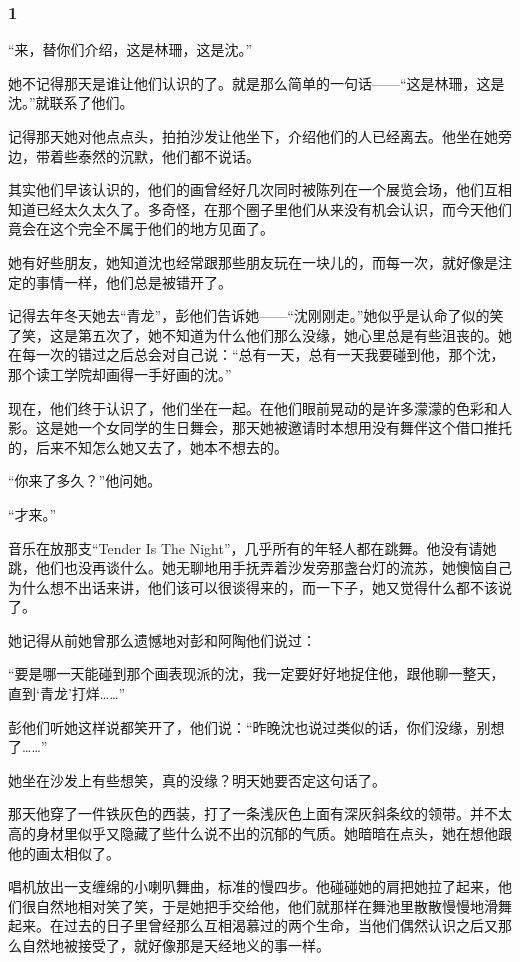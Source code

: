 \subsubsection*{1}
\par “来，替你们介绍，这是林珊，这是沈。”
\par 她不记得那天是谁让他们认识的了。就是那么简单的一句话——“这是林珊，这是沈。”就联系了他们。
\par 记得那天她对他点点头，拍拍沙发让他坐下，介绍他们的人已经离去。他坐在她旁边，带着些泰然的沉默，他们都不说话。
\par 其实他们早该认识的，他们的画曾经好几次同时被陈列在一个展览会场，他们互相知道已经太久太久了。多奇怪，在那个圈子里他们从来没有机会认识，而今天他们竟会在这个完全不属于他们的地方见面了。
\par 她有好些朋友，她知道沈也经常跟那些朋友玩在一块儿的，而每一次，就好像是注定的事情一样，他们总是被错开了。
\par 记得去年冬天她去“青龙”，彭他们告诉她——“沈刚刚走。”她似乎是认命了似的笑了笑，这是第五次了，她不知道为什么他们那么没缘，她心里总是有些沮丧的。她在每一次的错过之后总会对自己说：“总有一天，总有一天我要碰到他，那个沈，那个读工学院却画得一手好画的沈。”
\par 现在，他们终于认识了，他们坐在一起。在他们眼前晃动的是许多濛濛的色彩和人影。这是她一个女同学的生日舞会，那天她被邀请时本想用没有舞伴这个借口推托的，后来不知怎么她又去了，她本不想去的。
\par “你来了多久？”他问她。
\par “才来。”
\par 音乐在放那支“Tender Is The Night”，几乎所有的年轻人都在跳舞。他没有请她跳，他们也没再谈什么。她无聊地用手抚弄着沙发旁那盏台灯的流苏，她懊恼自己为什么想不出话来讲，他们该可以很谈得来的，而一下子，她又觉得什么都不该说了。
\par 她记得从前她曾那么遗憾地对彭和阿陶他们说过：
\par “要是哪一天能碰到那个画表现派的沈，我一定要好好地捉住他，跟他聊一整天，直到‘青龙’打烊……”
\par 彭他们听她这样说都笑开了，他们说：“昨晚沈也说过类似的话，你们没缘，别想了……”
\par 她坐在沙发上有些想笑，真的没缘？明天她要否定这句话了。
\par 那天他穿了一件铁灰色的西装，打了一条浅灰色上面有深灰斜条纹的领带。并不太高的身材里似乎又隐藏了些什么说不出的沉郁的气质。她暗暗在点头，她在想他跟他的画太相似了。
\par 唱机放出一支缠绵的小喇叭舞曲，标准的慢四步。他碰碰她的肩把她拉了起来，他们很自然地相对笑了笑，于是她把手交给他，他们就那样在舞池里散散慢慢地滑舞起来。在过去的日子里曾经那么互相渴慕过的两个生命，当他们偶然认识之后又那么自然地被接受了，就好像那是天经地义的事一样。
